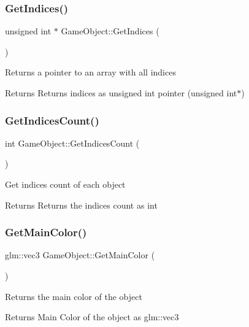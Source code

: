 \subsubsection{\texorpdfstring{GetIndices()}{GetIndices()}}
{\footnotesize\ttfamily unsigned int $\ast$ Game\+Object\+::\+Get\+Indices (\begin{DoxyParamCaption}{ }\end{DoxyParamCaption})}

Returns a pointer to an array with all indices \begin{DoxyReturn}{Returns}
Returns indices as unsigned int pointer (unsigned int$\ast$) 
\end{DoxyReturn}
\mbox{\label{class_game_object_a5f11058ab58b1e3fd0bba65eca1dad4a}} 
\subsubsection{\texorpdfstring{GetIndicesCount()}{GetIndicesCount()}}
{\footnotesize\ttfamily int Game\+Object\+::\+Get\+Indices\+Count (\begin{DoxyParamCaption}{ }\end{DoxyParamCaption})}

Get indices count of each object \begin{DoxyReturn}{Returns}
Returns the indices count as int 
\end{DoxyReturn}
\mbox{\label{class_game_object_a9f320ff03b3cbf254511952dc2f3951a}} 
\subsubsection{\texorpdfstring{GetMainColor()}{GetMainColor()}}
{\footnotesize\ttfamily glm\+::vec3 Game\+Object\+::\+Get\+Main\+Color (\begin{DoxyParamCaption}{ }\end{DoxyParamCaption})}

Returns the main color of the object \begin{DoxyReturn}{Returns}
Main Color of the object as glm\+::vec3 
\end{DoxyReturn}
\mbox{\label{class_game_object_af68f8296127c57c48ae14e52186a4549}} 
